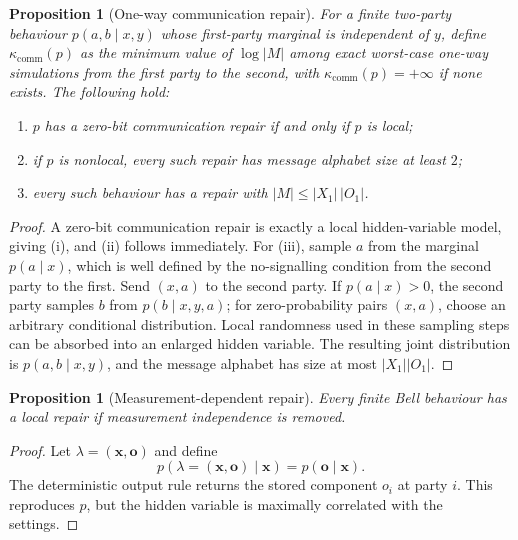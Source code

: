 \documentclass[11pt]{article}
\theoremstyle{plain}
\newtheorem{proposition}[theorem]{Proposition}
\theoremstyle{definition}
\theoremstyle{remark}
\begin{document}
\begin{proposition}[One-way communication repair]
\label{prop:communication-repair}
For a finite two-party behaviour \(p(a,b\mid x,y)\) whose first-party marginal is
independent of \(y\), define \(\kappa_{\mathrm{comm}}(p)\) as the minimum value
of \(\log |M|\) among exact worst-case one-way simulations from the first party
to the second, with \(\kappa_{\mathrm{comm}}(p)=+\infty\) if none exists. The
following hold:
\begin{enumerate}[label=(\roman*)]
\item \(p\) has a zero-bit communication repair if and only if \(p\) is local;
\item if \(p\) is nonlocal, every such repair has message alphabet size at least
\(2\);
\item every such behaviour has a repair with \(|M|\le |X_1|\,|O_1|\).
\end{enumerate}
\end{proposition}

\begin{proof}
A zero-bit communication repair is exactly a local hidden-variable model, giving (i), and
(ii) follows immediately. For (iii), sample \(a\) from the marginal
\(p(a\mid x)\), which is well defined by the no-signalling condition from the
second party to the first. Send \((x,a)\) to the second party. If
\(p(a\mid x)>0\), the second party samples \(b\) from \(p(b\mid x,y,a)\); for
zero-probability pairs \((x,a)\), choose an arbitrary conditional distribution.
Local randomness used in these sampling steps can be absorbed into an enlarged
hidden variable. The resulting joint distribution is \(p(a,b\mid x,y)\), and the
message alphabet has size at most \(|X_1||O_1|\).
\end{proof}

\begin{proposition}[Measurement-dependent repair]
\label{prop:measurement-dependence-repair}
Every finite Bell behaviour has a local repair if measurement independence is
removed.
\end{proposition}

\begin{proof}
Let \(\lambda=(\mathbf x,
\mathbf o)\) and define
\[
p(\lambda=(\mathbf x,
\mathbf o)\mid\mathbf x)=p(\mathbf o\mid\mathbf x).
\]
The deterministic output rule returns the stored component \(o_i\) at party
\(i\). This reproduces \(p\), but the hidden variable is maximally correlated
with the settings.
\end{proof}
\end{document}
